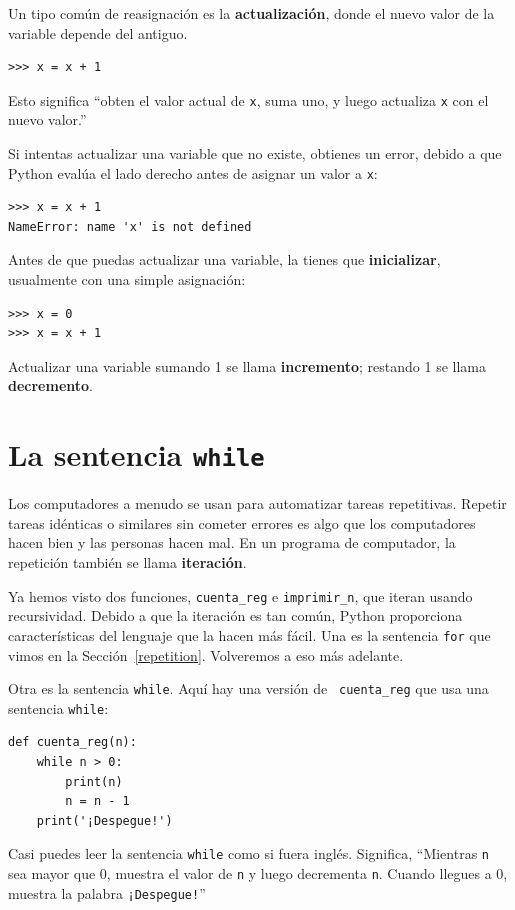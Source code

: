 \documentclass[10pt]{book}
\begin{document}
Un tipo común de reasignación es la {\bf actualización},
donde el nuevo valor de la variable depende del antiguo.

\begin{verbatim}
>>> x = x + 1
\end{verbatim}
%
Esto significa ``obten el valor actual de {\tt x}, suma uno, y luego
actualiza {\tt x} con el nuevo valor.''

Si intentas actualizar una variable que no existe, obtienes un
error, debido a que Python evalúa el lado derecho antes de asignar
un valor a {\tt x}:

\begin{verbatim}
>>> x = x + 1
NameError: name 'x' is not defined
\end{verbatim}
%
Antes de que puedas actualizar una variable, la tienes que {\bf inicializar},
usualmente con una simple asignación:

\begin{verbatim}
>>> x = 0
>>> x = x + 1
\end{verbatim}
%
Actualizar una variable sumando 1 se llama {\bf incremento};
restando 1 se llama {\bf decremento}.




\section{La sentencia {\tt while}}

Los computadores a menudo se usan para automatizar tareas repetitivas.  Repetir
tareas idénticas o similares sin cometer errores es algo que
los computadores hacen bien y las personas hacen mal.  En un programa de computador,
la repetición también se llama {\bf iteración}.

Ya hemos visto dos funciones, {\tt cuenta\_reg} e
\verb"imprimir_n", que iteran usando recursividad.  Debido a que la iteración es tan
común, Python proporciona características del lenguaje que la hacen más fácil.
Una es la sentencia {\tt for} que vimos en la Sección~\ref{repetition}.
Volveremos a eso más adelante.

Otra es la sentencia {\tt while}.  Aquí hay una versión de {\tt
cuenta\_reg} que usa una sentencia {\tt while}:

\begin{verbatim}
def cuenta_reg(n):
    while n > 0:
        print(n)
        n = n - 1
    print('¡Despegue!')
\end{verbatim}
%
Casi puedes leer la sentencia {\tt while} como si fuera inglés.
Significa, ``Mientras {\tt n} sea mayor que 0,
muestra el valor de {\tt n} y luego decrementa
{\tt n}.  Cuando llegues a 0, muestra la palabra {\tt ¡Despegue!}''
\end{document}
